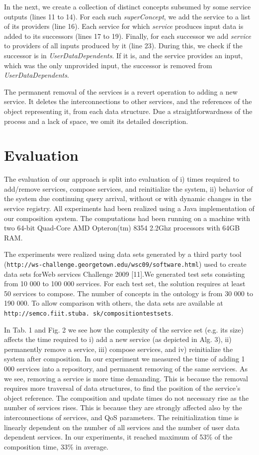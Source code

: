 \documentclass[11pt]{llncs}
\begin{document}
In the next, we create a collection of distinct concepts subsumed by some service
outputs (lines 11 to 14). For each such \emph{superConcept}, we add the service to a list of
its providers (line 16). Each service for which \emph{service} produces input data is added to
its successors (lines 17 to 19). Finally, for each successor we add \emph{service} to providers
of all inputs produced by it (line 23). During this, we check if the successor is in
\emph{UserDataDependents}. If it is, and the service provides an input, which was the only
unprovided input, the successor is removed from \emph{UserDataDependents}.

The permanent removal of the services is a revert operation to adding a new
service. It deletes the interconnections to other services, and the references of the
object representing it, from each data structure. Due a straightforwardness of the
process and a lack of space, we omit its detailed description.

\section{Evaluation}

The evaluation of our approach is split into evaluation of i) times required to
add/remove services, compose services, and reinitialize the system, ii) behavior of
the system due continuing query arrival, without or with dynamic changes in the
service registry. All experiments had been realized using a Java implementation of
our composition system. The computations had been running on a machine with two
64-bit Quad-Core AMD Opteron(tm) 8354 2.2Ghz processors with 64GB RAM.

The experiments were realized using data sets generated by a third party tool
(\small\texttt{http://ws-challenge.georgetown.edu/wsc09/software.html}\normalsize) used to create data sets
forWeb services Challenge 2009 [11].We generated test sets consisting from 10 000
to 100 000 services. For each test set, the solution requires at least 50 services to
compose. The number of concepts in the ontology is from 30 000 to 190 000. To
allow comparison with others, the data sets are available at \small\texttt{http://semco.fiit.stuba.
sk/compositiontestsets}\normalsize.

In Tab. 1 and Fig. 2 we see how the complexity of the service set (e.g. its size)
affects the time required to i) add a new service (as depicted in Alg. 3), ii) permanently
remove a service, iii) compose services, and iv) reinitialize the system after
composition. In our experiment we measured the time of adding 1 000 services into
a repository, and permanent removing of the same services. As we see, removing a
service is more time demanding. This is because the removal requires more traversal
of data structures, to find the position of the service’s object reference. The composition
and update times do not necessary rise as the number of services rises. This
is because they are strongly affected also by the interconnections of services, and
QoS parameters. The reinitialization time is linearly dependent on the number of
all services and the number of user data dependent services. In our experiments, it
reached maximum of 53\% of the composition time, 33\% in average.
\end{document}

